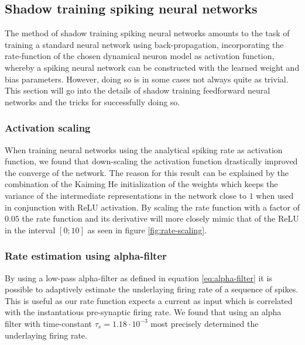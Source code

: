 \documentclass[a4paper,11pt]{article} %
\begin{document}
\subsection{Shadow training spiking neural networks}
The method of shadow training spiking neural networks amounts to the task of training a standard neural network using back-propagation, incorporating the rate-function of the chosen dynamical neuron model as activation function, whereby a spiking neural network can be constructed with the learned weight and bias parameters. However, doing so is in some cases not always quite as trivial. This section will go into the details of shadow training feedforward neural networks and the tricks for successfully doing so. 

\subsubsection{Activation scaling}
When training neural networks using the analytical spiking rate as activation function, we found that down-scaling the activation function drastically improved the converge of the network. The reason for this result can be explained by the combination of the Kaiming He initialization of the weights which keeps the variance of the intermediate representations in the network close to $1$ when used in conjunction with ReLU activation. By scaling the rate function with a factor of $0.05$ the rate function and its derivative will more closely mimic that of the ReLU in the interval $[0; 10]$ as seen in figure \ref{fig:rate-scaling}. 

\subsubsection{Rate estimation using alpha-filter}
By using a low-pass alpha-filter as defined in equation \ref{eq:alpha-filter} it is possible to adaptively estimate the underlaying firing rate of a sequence of spikes. This is useful as our rate function expects a current as input which is correlated with the instantatious pre-synaptic firing rate. We found that using an alpha filter with time-constant $\tau_s = 1.18 \cdot 10^{-3}$ most precisely determined the underlaying firing rate. 
\end{document}

